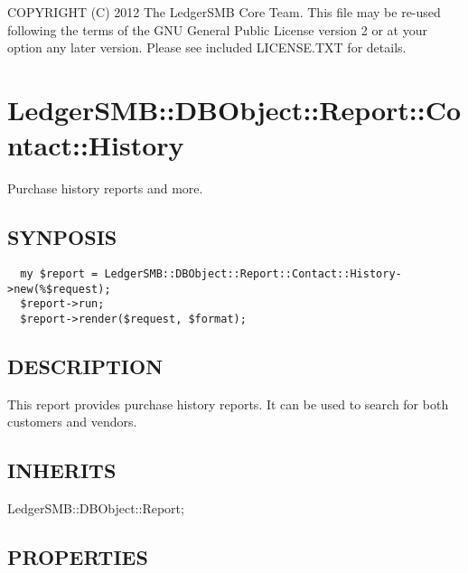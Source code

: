 \begin{description}
\begin{description}
\begin{description}
\begin{description}
\begin{description}
\begin{description}
\begin{description}
\begin{description}
\begin{description}
\begin{description}
COPYRIGHT (C) 2012 The LedgerSMB Core Team.  This file may be re-used following
the terms of the GNU General Public License version 2 or at your option any
later version.  Please see included LICENSE.TXT for details.

\section{LedgerSMB::DBObject::Report::Contact::History\label{LedgerSMB::DBObject::Report::Contact::History}}


Purchase history reports
and more.

\subsection*{SYNPOSIS\label{LedgerSMB::DBObject::Report::Contact::History_SYNPOSIS}}
\begin{verbatim}
  my $report = LedgerSMB::DBObject::Report::Contact::History->new(%$request);
  $report->run;
  $report->render($request, $format);
\end{verbatim}
\subsection*{DESCRIPTION\label{LedgerSMB::DBObject::Report::Contact::History_DESCRIPTION}}


This report provides purchase history reports.  It can be used to search for 
both customers and vendors.

\subsection*{INHERITS\label{LedgerSMB::DBObject::Report::Contact::History_INHERITS}}
\begin{description}

\item[{LedgerSMB::DBObject::Report;}] \mbox{}\end{description}
\subsection*{PROPERTIES\label{LedgerSMB::DBObject::Report::Contact::History_PROPERTIES}}
\begin{description}


\end{description}
\end{description}
\end{description}
\end{description}
\end{description}
\end{description}
\end{description}
\end{description}
\end{description}
\end{description}
\end{description}
